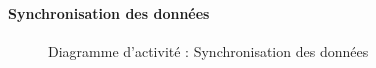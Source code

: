 \newpage
\paragraph{Synchronisation des données}
\begin{bigcenter}
    \begin{figure}[h]
        \centering
        \scalebox{0.7}{}
        \caption{Diagramme d'activité : Synchronisation des données}
        \label{SyncSynchronisation}
    \end{figure}
\end{bigcenter}



